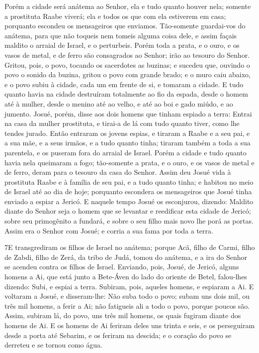 Porém a cidade será anátema ao Senhor, ela e tudo quanto houver
nela; somente a prostituta Raabe viverá; ela e todos os que com ela
estiverem em casa; porquanto escondeu os mensageiros que enviamos.
Tão-somente guardai-vos do anátema, para que não toqueis nem
tomeis alguma coisa dele, e assim façais maldito o arraial de
Israel, e o perturbeis. Porém toda a prata, e o ouro, e os
vasos de metal, e de ferro são consagrados ao Senhor; irão ao
tesouro do Senhor. Gritou, pois, o povo, tocando os
sacerdotes as buzinas; e sucedeu que, ouvindo o povo o sonido da
buzina, gritou o povo com grande brado; e o muro caiu abaixo, e o
povo subiu à cidade, cada um em frente de si, e tomaram a cidade.
E tudo quanto havia na cidade destruíram totalmente ao fio da
espada, desde o homem até à mulher, desde o menino até ao velho, e
até ao boi e gado miúdo, e ao jumento. Josué, porém, disse
aos dois homens que tinham espiado a terra: Entrai na casa da mulher
prostituta, e tirai-a de lá com tudo quanto tiver, como lhe tendes
jurado. Então entraram os jovens espias, e tiraram a Raabe e
a seu pai, e a sua mãe, e a seus irmãos, e a tudo quanto tinha;
tiraram também a toda a sua parentela, e os puseram fora do arraial
de Israel. Porém a cidade e tudo quanto havia nela queimaram
a fogo; tão-somente a prata, e o ouro, e os vasos de metal e de
ferro, deram para o tesouro da casa do Senhor. Assim deu
Josué vida à prostituta Raabe e à família de seu pai, e a tudo
quanto tinha; e habitou no meio de Israel até ao dia de hoje;
porquanto escondera os mensageiros que Josué tinha enviado a espiar
a Jericó. E naquele tempo Josué os esconjurou, dizendo:
Maldito diante do Senhor seja o homem que se levantar e reedificar
esta cidade de Jericó; sobre seu primogênito a fundará, e sobre o
seu filho mais novo lhe porá as portas. Assim era o Senhor
com Josué; e corria a sua fama por toda a terra.

\medskip

\lettrine{7} E transgrediram os filhos de Israel no anátema;
porque Acã, filho de Carmi, filho de Zabdi, filho de Zerá, da tribo
de Judá, tomou do anátema, e a ira do Senhor se acendeu contra os
filhos de Israel. Enviando, pois, Josué, de Jericó, alguns
homens a Ai, que está junto a Bete-Áven do lado do oriente de Betel,
falou-lhes dizendo: Subi, e espiai a terra. Subiram, pois, aqueles
homens, e espiaram a Ai. E voltaram a Josué, e disseram-lhe: Não
suba todo o povo; subam uns dois mil, ou três mil homens, a ferir a
Ai; não fatigueis ali a todo o povo, porque poucos são. Assim,
subiram lá, do povo, uns três mil homens, os quais fugiram diante
dos homens de Ai. E os homens de Ai feriram deles uns trinta e
seis, e os perseguiram desde a porta até Sebarim, e os feriram na
descida; e o coração do povo se derreteu e se tornou como água.

